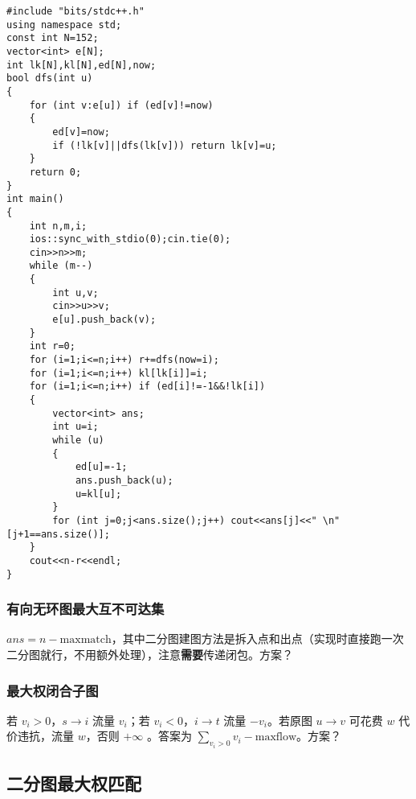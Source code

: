 \documentclass[12pt]{ctexart}
\begin{document}
\begin{lstlisting}
#include "bits/stdc++.h"
using namespace std;
const int N=152;
vector<int> e[N];
int lk[N],kl[N],ed[N],now;
bool dfs(int u)
{
	for (int v:e[u]) if (ed[v]!=now)
	{
		ed[v]=now;
		if (!lk[v]||dfs(lk[v])) return lk[v]=u;
	}
	return 0;
}
int main()
{
	int n,m,i;
	ios::sync_with_stdio(0);cin.tie(0);
	cin>>n>>m;
	while (m--)
	{
		int u,v;
		cin>>u>>v;
		e[u].push_back(v);
	}
	int r=0;
	for (i=1;i<=n;i++) r+=dfs(now=i);
	for (i=1;i<=n;i++) kl[lk[i]]=i;
	for (i=1;i<=n;i++) if (ed[i]!=-1&&!lk[i])
	{
		vector<int> ans;
		int u=i;
		while (u)
		{
			ed[u]=-1;
			ans.push_back(u);
			u=kl[u];
		}
		for (int j=0;j<ans.size();j++) cout<<ans[j]<<" \n"[j+1==ans.size()];
	}
	cout<<n-r<<endl;
}
\end{lstlisting}

\subsubsection{有向无环图最大互不可达集}

$ans=n-\text{maxmatch}$，其中二分图建图方法是拆入点和出点（实现时直接跑一次二分图就行，不用额外处理），注意\textbf{需要}传递闭包。方案？

\subsubsection{最大权闭合子图}

若 $v_i>0$，$s\to i$ 流量 $v_i$；若 $v_i<0$，$i\to t$ 流量 $-v_i$。若原图 $u\to v$ 可花费 $w$ 代价违抗，流量 $w$，否则 $+\infty$ 。答案为 $\sum\limits_{v_i>0} v_i-\text{maxflow}$。方案？

\subsection{二分图最大权匹配}
\end{document}
